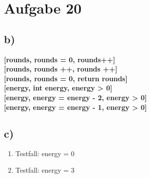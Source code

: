	\section*{Aufgabe 20}
		\subsection*{b)}
			\textbf{[rounds, rounds = 0, rounds++]} \\
			\textbf{[rounds, rounds ++, rounds ++]} \\
			\textbf{[rounds, rounds = 0, return rounds]} \\
			\textbf{[energy, int energy, energy > 0]} \\
			\textbf{[energy, energy = energy - 2, energy > 0]} \\
			\textbf{[energy, energy = energy - 1, energy > 0]}
		\subsection*{c)}
			\begin{enumerate}
				\item Testfall: energy = 0
				\item Testfall: energy = 3
			\end{enumerate}

